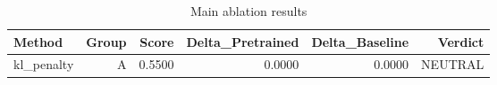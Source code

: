 \begin{table}[htbp]
\centering
\caption{Main ablation results}
\label{tab:main-results}
\begin{tabular}{lrrrrr}
\toprule
\textbf{Method} & \textbf{Group} & \textbf{Score} & \textbf{Delta\_Pretrained} & \textbf{Delta\_Baseline} & \textbf{Verdict} \\
\midrule
kl\_penalty & A & 0.5500 & 0.0000 & 0.0000 & NEUTRAL \\
\bottomrule
\end{tabular}
\end{table}